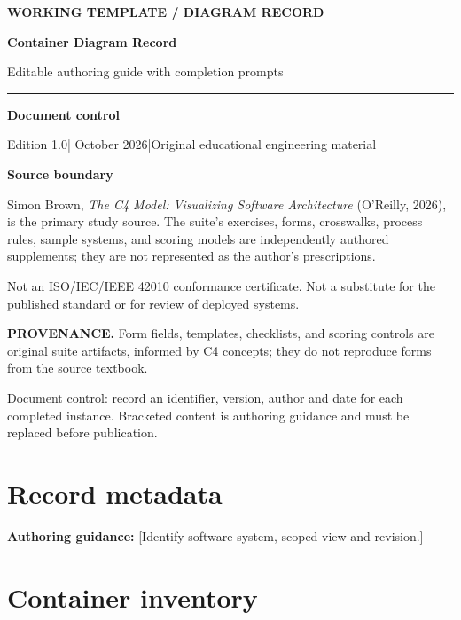 \documentclass[10pt,letterpaper]{article}
\newcommand{\WritingSpace}[1]{\par\vspace{2pt}\noindent\fcolorbox{C4Line}{white}{\parbox[t][#1][t]{0.94\linewidth}{\hspace{1pt}}}\par\vspace{7pt}}
\newcommand{\Prompter}[1]{\par{\small\color{C4Teal}\textbf{Authoring guidance:} #1}\par}
\newcommand{\SourceNote}[1]{\par\smallskip\noindent\colorbox{C4Light}{\parbox{0.94\linewidth}{\footnotesize\textbf{PROVENANCE.} #1}}\par\medskip}
\newcommand{\DocStart}[3]{%
\begin{document}
\begin{titlepage}
\renewcommand{\thepage}{title-\arabic{page}}
\vspace*{0.55in}
{\sffamily\bfseries\small\color{C4Teal}#1}\par\vspace{0.24in}
{\sffamily\bfseries\fontsize{26}{31}\selectfont\color{C4Navy}#2}\par\vspace{0.18in}
{\large\color{C4Gray}#3}\par\vspace{0.4in}
\textcolor{C4Teal}{\rule{\linewidth}{1.15pt}}\par\vspace{0.24in}
\textbf{Document control}\par
Edition 1.0\quad|\quad 30 October 2026\quad|\quad Original educational engineering material\par
\vspace{0.17in}
\textbf{Source boundary}\par
Simon Brown, \emph{The C4 Model: Visualizing Software Architecture} (O'Reilly, 2026), is the primary study source. The suite's exercises, forms, crosswalks, process rules, sample systems, and scoring models are independently authored supplements; they are not represented as the author's prescriptions.\par
\vfill
{\small\color{C4Gray}Not an ISO/IEC/IEEE 42010 conformance certificate. Not a substitute for the published standard or for review of deployed systems.}\par
\end{titlepage}
}
\DocStart{WORKING TEMPLATE / DIAGRAM RECORD}{Container Diagram Record}{Editable authoring guide with completion prompts}
\SourceNote{Form fields, templates, checklists, and scoring controls are original suite artifacts, informed by C4 concepts; they do not reproduce forms from the source textbook.}
Document control: record an identifier, version, author and date for each completed instance. Bracketed content is authoring guidance and must be replaced before publication.

\section{Record metadata}

\Prompter{[Identify software system, scoped view and revision.]}
\WritingSpace{0.65in}
\section{Container inventory}
\end{document}
